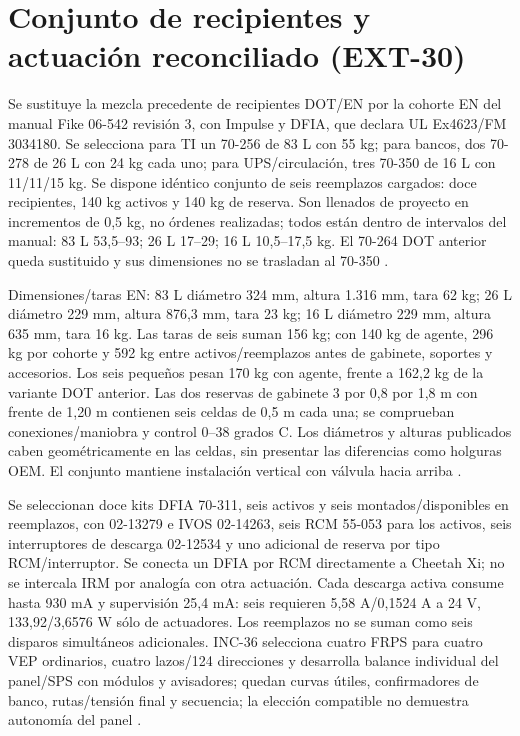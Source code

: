 \section{Conjunto de recipientes y actuación reconciliado (EXT-30)}
\label{sec:sd4-ext30}
Se sustituye la mezcla precedente de recipientes DOT/EN por la cohorte EN del manual Fike 06-542 revisión 3, con Impulse y DFIA, que declara UL Ex4623/FM 3034180. Se selecciona para TI un 70-256 de 83 L con 55 kg; para bancos, dos 70-278 de 26 L con 24 kg cada uno; para UPS/circulación, tres 70-350 de 16 L con 11/11/15 kg. Se dispone idéntico conjunto de seis reemplazos cargados: doce recipientes, 140 kg activos y 140 kg de reserva. Son llenados de proyecto en incrementos de 0,5 kg, no órdenes realizadas; todos están dentro de intervalos del manual: 83 L 53,5--93; 26 L 17--29; 16 L 10,5--17,5 kg. El 70-264 DOT anterior queda sustituido y sus dimensiones no se trasladan al 70-350 \parencite[ficha~06-542-1-2, pp.~1--2]{lote30-fike542}.

Dimensiones/taras EN: 83 L diámetro 324 mm, altura 1.316 mm, tara 62 kg; 26 L diámetro 229 mm, altura 876,3 mm, tara 23 kg; 16 L diámetro 229 mm, altura 635 mm, tara 16 kg. Las taras de seis suman 156 kg; con 140 kg de agente, 296 kg por cohorte y 592 kg entre activos/reemplazos antes de gabinete, soportes y accesorios. Los seis pequeños pesan 170 kg con agente, frente a 162,2 kg de la variante DOT anterior. Las dos reservas de gabinete 3 por 0,8 por 1,8 m con frente de 1,20 m contienen seis celdas de 0,5 m cada una; se comprueban conexiones/maniobra y control 0--38 grados C. Los diámetros y alturas publicados caben geométricamente en las celdas, sin presentar las diferencias como holguras OEM. El conjunto mantiene instalación vertical con válvula hacia arriba \parencite[ficha~06-542-1-2, pp.~1--2]{lote30-fike542}.

Se seleccionan doce kits DFIA 70-311, seis activos y seis montados/disponibles en reemplazos, con 02-13279 e IVOS 02-14263, seis RCM 55-053 para los activos, seis interruptores de descarga 02-12534 y uno adicional de reserva por tipo RCM/interruptor. Se conecta un DFIA por RCM directamente a Cheetah Xi; no se intercala IRM por analogía con otra actuación. Cada descarga activa consume hasta 930 mA y supervisión 25,4 mA: seis requieren 5,58 A/0,1524 A a 24 V, 133,92/3,6576 W sólo de actuadores. Los reemplazos no se suman como seis disparos simultáneos adicionales. INC-36 selecciona cuatro FRPS para cuatro VEP ordinarios, cuatro lazos/124 direcciones y desarrolla balance individual del panel/SPS con módulos y avisadores; quedan curvas útiles, confirmadores de banco, rutas/tensión final y secuencia; la elección compatible no demuestra autonomía del panel \parencite[ficha~06-432-1-5-DF, pp.~1--6]{lote30-fike542}.

